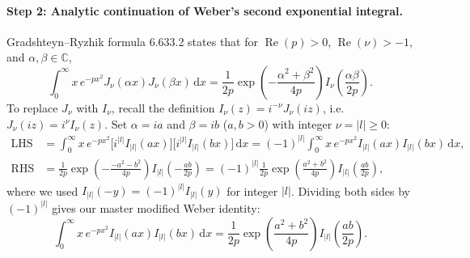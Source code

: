 \documentclass[10pt,letterpaper]{article}
\newcommand{\abs}[1]{\lvert #1 \rvert}
\newcommand{\dd}{\mathrm{d}}
\numberwithin{equation}{section}
\begin{document}
\paragraph*{Step 2: Analytic continuation of Weber's second exponential integral.}
Gradshteyn--Ryzhik formula 6.633.2 states that for $\operatorname{Re}(p) > 0$, $\operatorname{Re}(\nu) > -1$, and $\alpha,\beta \in \mathbb{C}$,
\begin{equation}
  \int_0^\infty x\,e^{-p x^2} J_\nu(\alpha x) J_\nu(\beta x)\,\dd x = \frac{1}{2p}\exp\!\left(-\frac{\alpha^2 + \beta^2}{4p}\right) I_\nu\!\left(\frac{\alpha\beta}{2p}\right).
  \label{eq:wb_weber_J}
\end{equation}
To replace $J_\nu$ with $I_\nu$, recall the definition $I_\nu(z) = i^{-\nu} J_\nu(iz)$, i.e.\ $J_\nu(iz) = i^\nu I_\nu(z)$. Set $\alpha = ia$ and $\beta = ib$ ($a, b > 0$) with integer $\nu = \abs{l} \ge 0$:
\begin{align}
  \text{LHS} &= \int_0^\infty x\,e^{-px^2}\bigl[i^{\abs{l}} I_{\abs{l}}(ax)\bigr]\bigl[i^{\abs{l}} I_{\abs{l}}(bx)\bigr]\,\dd x = (-1)^{\abs{l}} \int_0^\infty x\,e^{-px^2} I_{\abs{l}}(ax) I_{\abs{l}}(bx)\,\dd x, \\
  \text{RHS} &= \frac{1}{2p}\exp\!\left(-\frac{-a^2 - b^2}{4p}\right) I_{\abs{l}}\!\left(-\frac{ab}{2p}\right) = (-1)^{\abs{l}}\frac{1}{2p}\exp\!\left(\frac{a^2+b^2}{4p}\right) I_{\abs{l}}\!\left(\frac{ab}{2p}\right),
\end{align}
where we used $I_{\abs{l}}(-y) = (-1)^{\abs{l}} I_{\abs{l}}(y)$ for integer $\abs{l}$. Dividing both sides by $(-1)^{\abs{l}}$ gives our master modified Weber identity:
\begin{equation}
  \int_0^\infty x\,e^{-p x^2} I_{\abs{l}}(ax) I_{\abs{l}}(bx)\,\dd x = \frac{1}{2p}\exp\!\left(\frac{a^2+b^2}{4p}\right) I_{\abs{l}}\!\left(\frac{ab}{2p}\right).
  \label{eq:wb_weber_I}
\end{equation}
\end{document}

